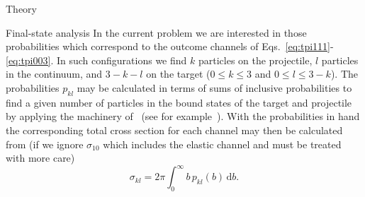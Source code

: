 \documentclass[aps, pra, reprint, groupedaddress, amsfonts, longbibliography,
               amsmath, amssymb, showpacs, nofootinbib]{revtex4-1}
\begin{document}
\begin{section}{Theory \label{sec:theory}}
\begin{subsection}{Final-state analysis \label{sec:probs}}
      In the current problem we are interested in those probabilities which correspond to the outcome
      channels of Eqs.~\eqref{eq:tpi111}-\eqref{eq:tpi003}. In such configurations we find $k$ particles
      on the projectile, $l$ particles in the continuum, and $3 - k - l$ on the target ($0\leq k \leq 3$
      and $0 \leq l \leq 3 - k$). The probabilities $p_{kl}$ may be calculated in terms of sums of
      inclusive probabilities to find a given number of particles in the bound states of the target and
      projectile by applying the machinery of~\cite{inc-prob} (see for example~\cite{incEx, mitsuko12,
      gerald15}). With the probabilities in hand the corresponding total cross section for each channel
      may then be calculated from (if we ignore $\sigma_{10}$ which includes the elastic channel and
      must be treated with more care)
      \begin{equation} \label{eq:cross}
         \sigma_{kl} = 2 \pi \int_0^\infty b \, p_{kl}(b) \, \mathrm{d}b.
      \end{equation}

   \end{subsection}

\end{section}
\end{document}
